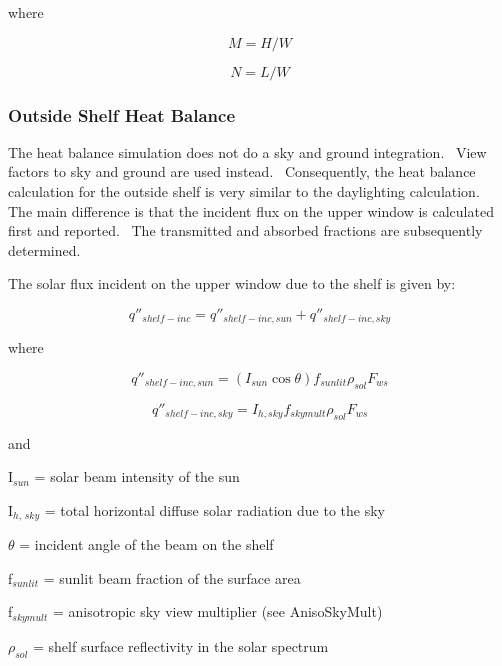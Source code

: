 where

\begin{equation}
M = H/W
\end{equation}

\begin{equation}
N = L/W
\end{equation}

\subsubsection{Outside Shelf Heat Balance}\label{outside-shelf-heat-balance}

The heat balance simulation does not do a sky and ground integration.~ View factors to sky and ground are used instead.~ Consequently, the heat balance calculation for the outside shelf is very similar to the daylighting calculation.~ The main difference is that the incident flux on the upper window is calculated first and reported.~ The transmitted and absorbed fractions are subsequently determined.

The solar flux incident on the upper window due to the shelf is given by:

\begin{equation}
{q''_{shelf - inc}} = {q''_{shelf - inc,sun}} + {q''_{shelf - inc,sky}}
\end{equation}

where

\begin{equation}
{q''_{shelf - inc,sun}} = \left( {{I_{sun}}\cos \theta } \right){f_{sunlit}}{\rho_{sol}}{F_{ws}}
\end{equation}

\begin{equation}
{q''_{shelf - inc,sky}} = {I_{h,sky}}{f_{skymult}}{\rho_{sol}}{F_{ws}}
\end{equation}

and

I\(_{sun}\) = solar beam intensity of the sun

I\(_{h,\, sky}\) = total horizontal diffuse solar radiation due to the sky

\(\theta\) = incident angle of the beam on the shelf

f\(_{sunlit}\) = sunlit beam fraction of the surface area

f\(_{skymult}\) = anisotropic sky view multiplier (see AnisoSkyMult)

\(\rho_{sol}\) = shelf surface reflectivity in the solar spectrum

